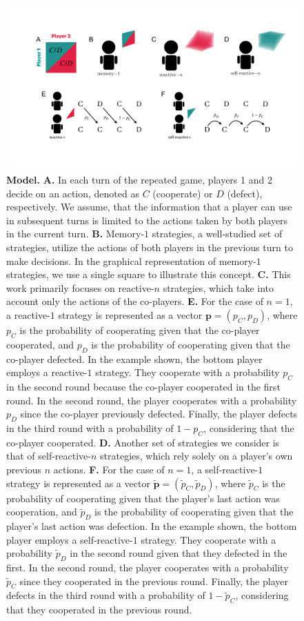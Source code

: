 \documentclass{article}
\theoremstyle{definition}
\begin{document}
\begin{figure}[h!]
  \centering
  \includegraphics[width=\textwidth]{figures/conceptual_figure_model.pdf}
  \caption{\textbf{Model.}
  \textbf{A.} In each turn of the repeated game, players 1 and 2 decide on an action,
  denoted as $C$ (cooperate) or $D$ (defect), respectively. We assume, that the information that a
  player can use in subsequent turns is limited to the actions taken by both
  players in the current turn.
  \textbf{B.} Memory-$1$ strategies, a well-studied set of strategies, utilize the
  actions of both players in the previous turn to make decisions. In the graphical
  representation of memory-$1$ strategies, we use a single square to illustrate this
  concept.
  \textbf{C.} This work primarily focuses on reactive-$n$ strategies, which take
  into account only the actions of the co-players.
  \textbf{E.} For the case of $n = 1$, a reactive-$1$ strategy is represented as a vector $\mathbf{p} =
  (p_C, p_D)$, where $p_C$ is the probability of cooperating given that the co-player
  cooperated, and $p_D$ is the probability of cooperating given that the co-player
  defected. In the example shown, the bottom player employs a reactive-$1$ strategy.
  They cooperate with a probability $p_C$ in the second round because the co-player
  cooperated in the first round. In the second round, the player cooperates with a
  probability $p_D$ since the co-player previously defected. Finally, the player
  defects in the third round with a probability of $1 - p_C$, considering that the
  co-player cooperated.
  \textbf{D.} Another set of strategies we consider is that of self-reactive-$n$
  strategies, which rely solely on a player's own previous $n$ actions.
  \textbf{F.} For the case of $n = 1$, a self-reactive-$1$ strategy is represented
  as a vector $\mathbf{\tilde{p}} = (\tilde{p}_C, \tilde{p}_D)$, where
  $\tilde{p}_C$ is the probability of cooperating given that the player's last
  action was cooperation, and $\tilde{p}_D$ is the probability of cooperating
  given that the player's last action was defection. In the example shown, the
  bottom player employs a self-reactive-$1$ strategy. They cooperate with a
  probability $\tilde{p}_D$ in the second round given that they defected in the
  first. In the second round, the player cooperates with a probability
  $\tilde{p}_C$ since they cooperated in the previous round. Finally, the player
  defects in the third round with a probability of $1 - \tilde{p}_C$, considering
  that they cooperated in the previous round.}
\end{figure}
\end{document}
